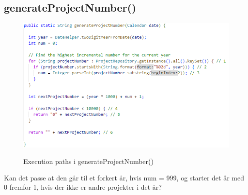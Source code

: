 \subsection{generateProjectNumber()} 
\begin{figure}[H]
    \centering
    \caption{Execution paths i generateProjectNumber()}
    \includegraphics[width = \textwidth, keepaspectratio]{ImplementationAndTest/Diagrams/wb_genProjNum.png}
    \label{fig:ep_generate_project_number}
\end{figure}
Kan det passe at den går til et forkert år, hvis num = 999, og starter det år med 0 fremfor 1, hvis der ikke er andre projekter i det år?
